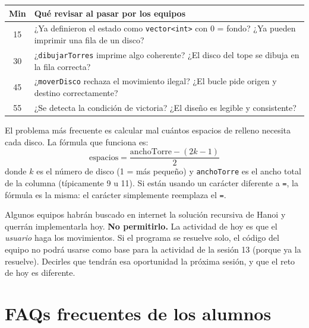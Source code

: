 \documentclass[12pt, oneside]{article}
\begin{document}
\begin{center}
\begin{tabular}{cp{10cm}}
  \toprule
  \textbf{Min} & \textbf{Qué revisar al pasar por los equipos} \\
  \midrule
  15 & ¿Ya definieron el estado como \texttt{vector<int>} con 0 = fondo?
       ¿Ya pueden imprimir una fila de un disco? \\
  30 & ¿\texttt{dibujarTorres} imprime algo coherente?
       ¿El disco del tope se dibuja en la fila correcta? \\
  45 & ¿\texttt{moverDisco} rechaza el movimiento ilegal?
       ¿El bucle pide origen y destino correctamente? \\
  55 & ¿Se detecta la condición de victoria?
       ¿El diseño es legible y consistente? \\
  \bottomrule
\end{tabular}
\end{center}

\begin{notaprofesor}
  El problema más frecuente es calcular mal cuántos espacios de relleno
  necesita cada disco.  La fórmula que funciona es:
  \[
    \text{espacios} = \frac{\text{anchoTorre} - (2k - 1)}{2}
  \]
  donde $k$ es el número de disco (1 = más pequeño) y \texttt{anchoTorre}
  es el ancho total de la columna (típicamente 9 u 11).
  Si están usando un carácter diferente a \texttt{=}, la fórmula es la
  misma: el carácter simplemente reemplaza el \texttt{=}.
\end{notaprofesor}

\begin{notaprofesor}
  Algunos equipos habrán buscado en internet la solución recursiva de
  Hanoi y querrán implementarla hoy.  \textbf{No permitirlo.}  La
  actividad de hoy es que el \textit{usuario} haga los movimientos.
  Si el programa se resuelve solo, el código del equipo no podrá usarse
  como base para la actividad de la sesión 13 (porque ya la resuelve).
  Decirles que tendrán esa oportunidad la próxima sesión, y que el reto
  de hoy es diferente.
\end{notaprofesor}

\section{FAQs frecuentes de los alumnos}
\end{document}
